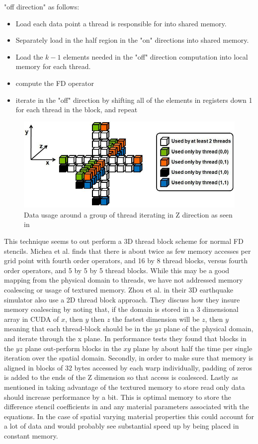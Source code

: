 \documentclass[conference]{IEEEtran}
\begin{document}
"off direction" as follows:


\begin{itemize}
    \item Load each data point a thread is responsible for into shared memory.
    \item Separately load in the half region in the "on" directions into shared memory.
    \item Load the $k-1$ elements needed in the "off" direction computation into local memory for each thread.
    \item compute the FD operator
    \item iterate in the "off" direction by shifting all of the elements in registers down 1 for each thread in the block, and repeat
    \end{itemize}


\begin{figure}[h]
\caption{Data usage around a group of thread iterating in Z direction as seen in \cite{Micikevicius}}
\includegraphics[scale=.25]{data2d.png}
\end{figure}


This technique seems to out perform a 3D thread block scheme for normal FD stencils. Michea et al.\cite{Michea} finds that there is about twice as few memory accesses per grid point with fourth order operators, and 16 by 8 thread blocks, versus fourth order operators, and 5 by 5 by 5 thread blocks. While this may be a good mapping from the physical domain to threads, we have not addressed memory coalescing or usage of textured memory. Zhou et al.\cite{Zhou1} in their 3D earthquake simulator also use a 2D thread block approach. They discuss how they insure memory coalescing by noting that, if the domain is stored in a 3 dimensional array in CUDA of $x$, then $y$ then $z$ the fastest dimension will be $z$, then $y$ meaning that each thread-block should be in the $yz$ plane of the physical domain, and iterate through the x plane. In performance tests they found that blocks in the $yz$ plane out-perform blocks in the $xy$ plane by about half the time per single iteration over the spatial domain. Secondly, in order to make sure that memory is aligned in blocks of 32 bytes accessed by each warp individually, padding of zeros is added to the ends of the Z dimension so that access is coalesced.
Lastly as mentioned in \cite{Harris} taking advantage of the textured memory to store read only data should increase performance by a bit. This is optimal memory to store the difference stencil coefficients in and any material parameters associated with the equations. In the case of spatial varying material properties this could account for a lot of data and would probably see substantial speed up by being placed in constant memory.
\end{document}
